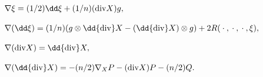 \begin{equation}
\begin{array}{ll}
\nabla\xi =(1/2)\dd\xi +(1/n)({\rm div}X)g,\\
\\
\nabla (\dd\xi )=(1/n)(g\otimes\dd {\rm div}X -(\dd{\rm 
div}X)\otimes g)+2R(\:\cdot\:,\:\cdot\:,\:\cdot\:,\xi ),\\
\\
\nabla ({\rm div}X)=\dd{\rm div}X,\\
\\
\nabla (\dd {\rm div}X)=-(n/2)\nabla_XP-({\rm
div}X)P-(n/2)Q.\\
\end{array}
\label{egyenletek}
\end{equation}

